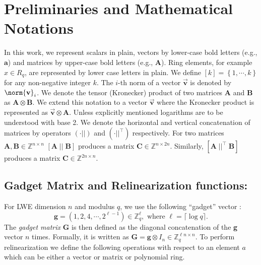 \section{Preliminaries and Mathematical Notations} \label{sec:prelims}
In this work, we represent scalars in plain, vectors by lower-case bold letters (e.g., $\mathbf{a}$) and matrices by upper-case bold letters (e.g., $\mathbf{A}$). Ring elements, for example  $x \in R_q$, are represented by lower case letters in plain. We define $\left[k\right] = \left\{1, \cdots , k\right\}$ for any non-negative integer $k$. The $i$-th norm of a vector $\vec{\mathbf{v}}$ is denoted by $\norm{\mathbf{v}}_i$. We denote the tensor (Kronecker) product of two matrices $\mathbf{A}$ and $\mathbf{B}$ as $\mathbf{A} \otimes \mathbf{B}$. We extend this notation to a vector $\vec{\mathbf{v}}$ where the Kronecker product is represented as  $\vec{\mathbf{v}} \otimes \mathbf{A}$. Unless explicitly mentioned logarithms are to be understood with base 2. We denote the horizontal and vertical concatenation of matrices by operators $\left(\cdot||\right)$  and $\left( \cdot ||^\intercal \right)$ respectively. For two matrices $\mathbf{A},\mathbf{B} \in \mathbb{Z}^{n \times n}$ $\left[ \mathbf{A} \; || \; \mathbf{B} \right]$ produces a matrix $\mathbf{C} \in \mathbb{Z}^{n \times 2n}$. Similarly, $\left[ \mathbf{A} \; ||^\intercal \; \mathbf{B} \right]$ produces a matrix $\mathbf{C} \in \mathbb{Z}^{2n \times n}$.


\subsection{Gadget Matrix and Relinearization functions:}

For LWE dimension $n$ and modulus $q$, we use the following ``gadget'' vector \cite{micciancio2012trapdoors}: 
$$\mathbf{g} = \left(1,2,4,\cdots,2^{\ell-1} \right) \in \mathbb{Z}_q^{\ell}, \text{ where } \ell = \lceil \log q \rceil.$$
The \emph{gadget matrix} \textbf{G} is then defined as the diagonal concatenation of the \textbf{g} vector $n$ times. Formally, it is written as $ \mathbf{G} = \mathbf{g} \otimes I_n \in \mathbb{Z}_q^{\ell n\times n}$. To perform relinearization we define the following operations \cite{brakerski2011fully, gentry2013homomorphic} with respect to an element $a$ which can be either a vector or matrix or polynomial ring. 

